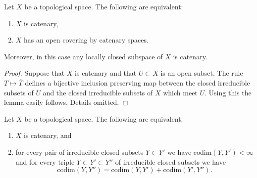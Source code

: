 \begin{lemma}
\label{lemma-catenary}
Let $X$ be a topological space.
The following are equivalent:
\begin{enumerate}
\item $X$ is catenary,
\item $X$ has an open covering by catenary spaces.
\end{enumerate}
Moreover, in this case any locally closed subspace of $X$ is catenary.
\end{lemma}

\begin{proof}
Suppose that $X$ is catenary and that $U \subset X$ is an open
subset. The rule $T \mapsto \overline{T}$ defines a bijective
inclusion preserving map between the closed irreducible subsets
of $U$ and the closed irreducible subsets of $X$ which meet $U$.
Using this the lemma easily follows. Details omitted.
\end{proof}

\begin{lemma}
\label{lemma-catenary-in-codimension}
Let $X$ be a topological space. The following are equivalent:
\begin{enumerate}
\item $X$ is catenary, and
\item for every pair of irreducible closed subsets $Y \subset Y'$ we have
$\text{codim}(Y, Y') < \infty$ and for every triple
$Y \subset Y' \subset Y''$ of irreducible closed subsets we have
$$
\text{codim}(Y, Y'') = \text{codim}(Y, Y') + \text{codim}(Y', Y'').
$$
\end{enumerate}
\end{lemma}

